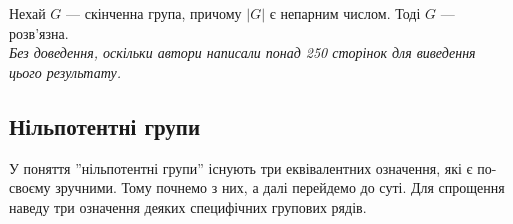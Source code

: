 \documentclass{math_library}
\begin{document}
\begin{theorem}
Нехай $G$ --- скінченна група, причому $|G|$ є непарним числом. Тоді $G$ --- розв'язна.\\
\textit{Без доведення, оскільки автори написали понад 250 сторінок для виведення цього результату.}
\end{theorem}

\subsection{Нільпотентні групи}
У поняття ''нільпотентні групи'' існують три еквівалентних означення, які є по-своєму зручними. Тому почнемо з них, а далі перейдемо до суті. Для спрощення наведу три означення деяких специфічних групових рядів.
\end{document}
